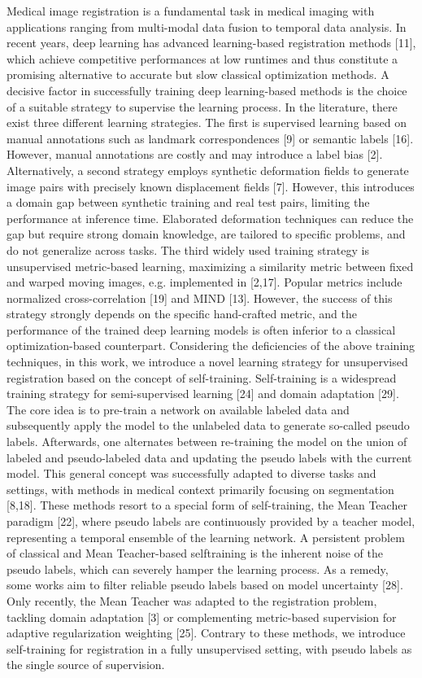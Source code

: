 Medical image registration is a fundamental task in medical imaging with applications ranging from multi-modal data fusion to temporal data analysis. In recent years, deep learning has advanced learning-based registration methods [11], which achieve competitive performances at low runtimes and thus constitute a promising alternative to accurate but slow classical optimization methods. A decisive factor in successfully training deep learning-based methods is the choice of a suitable strategy to supervise the learning process. In the literature, there exist three different learning strategies. The first is supervised learning based on manual annotations such as landmark correspondences [9] or semantic labels [16]. However, manual annotations are costly and may introduce a label bias [2]. Alternatively, a second strategy employs synthetic deformation fields to generate image pairs with precisely known displacement fields [7]. However, this introduces a domain gap between synthetic training and real test pairs, limiting the performance at inference time. Elaborated deformation techniques can reduce the gap but require strong domain knowledge, are tailored to specific problems, and do not generalize across tasks. The third widely used training strategy is unsupervised metric-based learning, maximizing a similarity metric between fixed and warped moving images, e.g. implemented in [2,17]. Popular metrics include normalized cross-correlation [19] and MIND [13]. However, the success of this strategy strongly depends on the specific hand-crafted metric, and the performance of the trained deep learning models is often inferior to a classical optimization-based counterpart. Considering the deficiencies of the above training techniques, in this work, we introduce a novel learning strategy for unsupervised registration based on the concept of self-training. Self-training is a widespread training strategy for semi-supervised learning [24] and domain adaptation [29]. The core idea is to pre-train a network on available labeled data and subsequently apply the model to the unlabeled data to generate so-called pseudo labels. Afterwards, one alternates between re-training the model on the union of labeled and pseudo-labeled data and updating the pseudo labels with the current model. This general concept was successfully adapted to diverse tasks and settings, with methods in medical context primarily focusing on segmentation [8,18]. These methods resort to a special form of self-training, the Mean Teacher paradigm [22], where pseudo labels are continuously provided by a teacher model, representing a temporal ensemble of the learning network. A persistent problem of classical and Mean Teacher-based selftraining is the inherent noise of the pseudo labels, which can severely hamper the learning process. As a remedy, some works aim to filter reliable pseudo labels based on model uncertainty [28]. Only recently, the Mean Teacher was adapted to the registration problem, tackling domain adaptation [3] or complementing metric-based supervision for adaptive regularization weighting [25]. Contrary to these methods, we introduce self-training for registration in a fully unsupervised setting, with pseudo labels as the single source of supervision.

